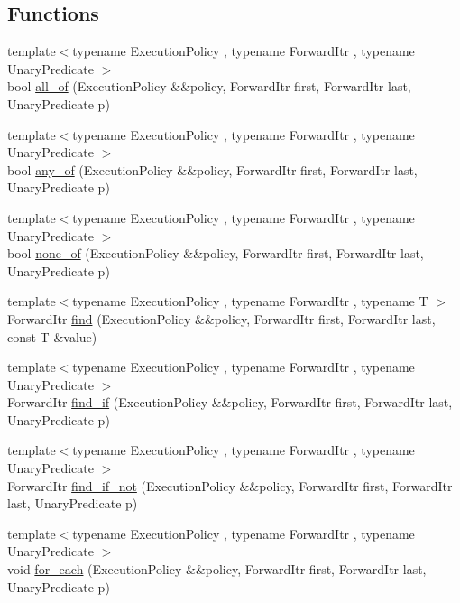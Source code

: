 \subsection*{Functions}
\begin{DoxyCompactItemize}
\item 
{\footnotesize template$<$typename Execution\-Policy , typename Forward\-Itr , typename Unary\-Predicate $>$ }\\bool \hyperlink{namespaceshad_ab0314482e6cdabff5bcb7f2833b0f937}{all\-\_\-of} (Execution\-Policy \&\&policy, Forward\-Itr first, Forward\-Itr last, Unary\-Predicate p)
\item 
{\footnotesize template$<$typename Execution\-Policy , typename Forward\-Itr , typename Unary\-Predicate $>$ }\\bool \hyperlink{namespaceshad_a8d17ad3a3f5f25ecfee20a7ae6ebf924}{any\-\_\-of} (Execution\-Policy \&\&policy, Forward\-Itr first, Forward\-Itr last, Unary\-Predicate p)
\item 
{\footnotesize template$<$typename Execution\-Policy , typename Forward\-Itr , typename Unary\-Predicate $>$ }\\bool \hyperlink{namespaceshad_a00b17ed7d3482e7fc389d344c68b42e8}{none\-\_\-of} (Execution\-Policy \&\&policy, Forward\-Itr first, Forward\-Itr last, Unary\-Predicate p)
\item 
{\footnotesize template$<$typename Execution\-Policy , typename Forward\-Itr , typename T $>$ }\\Forward\-Itr \hyperlink{namespaceshad_a63ec34eb3f98177db268051179d6057a}{find} (Execution\-Policy \&\&policy, Forward\-Itr first, Forward\-Itr last, const T \&value)
\item 
{\footnotesize template$<$typename Execution\-Policy , typename Forward\-Itr , typename Unary\-Predicate $>$ }\\Forward\-Itr \hyperlink{namespaceshad_ae5272738a131b86c7d9349bfff977aa4}{find\-\_\-if} (Execution\-Policy \&\&policy, Forward\-Itr first, Forward\-Itr last, Unary\-Predicate p)
\item 
{\footnotesize template$<$typename Execution\-Policy , typename Forward\-Itr , typename Unary\-Predicate $>$ }\\Forward\-Itr \hyperlink{namespaceshad_a42458d0084e37bb16f4745ee085aa2f5}{find\-\_\-if\-\_\-not} (Execution\-Policy \&\&policy, Forward\-Itr first, Forward\-Itr last, Unary\-Predicate p)
\item 
{\footnotesize template$<$typename Execution\-Policy , typename Forward\-Itr , typename Unary\-Predicate $>$ }\\void \hyperlink{namespaceshad_a7daf2afb8d216454ff4143be21237d0c}{for\-\_\-each} (Execution\-Policy \&\&policy, Forward\-Itr first, Forward\-Itr last, Unary\-Predicate p)

\end{DoxyCompactItemize}
